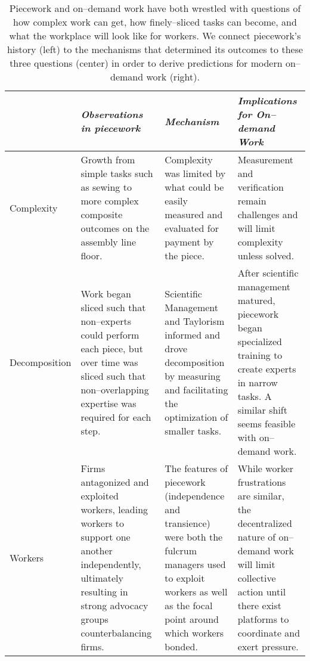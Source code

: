 \documentclass[trackingWork]{subfiles}
\begin{document}
\begin{table*}[t]
  \centering
  \begin{tabularx}{\textwidth}{l X X X}
    \toprule
    & \textit{Observations in piecework} & \textit{Mechanism} & \textit{Implications for On--demand Work} \\
    \midrule
    {Complexity} &
    \small{Growth from simple tasks such as sewing to more complex composite outcomes on the assembly line floor.} &
    \small{Complexity was limited by what could be easily measured and evaluated for payment by the piece.} &
    \small{Measurement and verification remain challenges and will limit complexity unless solved.} \\ \hline

    {Decomposition} &
    \small{Work began sliced such that non--experts could perform each piece, but over time was sliced such that non--overlapping expertise was required for each step.} &
    \small{Scientific Management and Taylorism informed and drove decomposition by measuring and facilitating the optimization of smaller tasks.} &
    \small{After scientific management matured, piecework began  specialized training to create experts in narrow tasks. A similar shift seems feasible with on--demand work.} \\ \hline

    {Workers} &
    \small{Firms antagonized and exploited workers, leading workers to support one another independently, ultimately resulting in strong advocacy groups counterbalancing firms.} &
    \small{The features of piecework (independence and transience) were both the fulcrum managers used to exploit workers as well as the focal point around which workers bonded.} &
    \small{While worker frustrations are similar, the decentralized nature of on--demand work will limit collective action until there exist platforms to coordinate and exert pressure.} \\ 
    \bottomrule
  \end{tabularx}
  \label{tab:overview}
  \caption{Piecework and on--demand work have both wrestled with questions of how complex work can get, how finely--sliced tasks can become, and what the workplace will look like for workers. We connect piecework's history (left) to the mechanisms that determined its outcomes to these three questions (center) in order to derive predictions for modern on--demand work (right). }
\end{table*}
\end{document}
